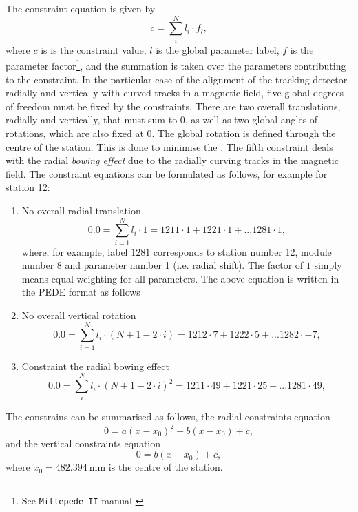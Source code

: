 \documentclass[12pt]{article}
\begin{document}
The constraint equation is given by
\begin{equation}
        c = \sum_i^N l_i\cdot f_l,
\end{equation}
where $c$ is is the constraint value, $l$ is the global parameter label, $f$ is the parameter factor\footnote{See \texttt{Millepede-II} manual \cite{mp2}}, and the summation is taken over the parameters contributing to the constraint. In the particular case of the alignment of the tracking detector radially and vertically with curved tracks in a magnetic field, five global degrees of freedom must be fixed by the constraints. There are two overall translations, radially and vertically, that must sum to 0, as well as two global angles of rotations, which are also fixed at 0. The global rotation is defined through the centre of the station. This is done to minimise the . The fifth constraint deals with the radial \textit{bowing effect} due to the radially curving tracks in the magnetic field. The constraint equations can be formulated as follows, for example for station 12:
\begin{enumerate}
    \item No overall radial translation
    \begin{equation}
        0.0 = \sum_{i=1}^N l_i\cdot 1 = 1211 \cdot 1 + 1221 \cdot 1 + ... 1281 \cdot 1,
    \end{equation}
    where, for example, label $1281$ corresponds to station number 12, module number 8 and parameter number 1 (i.e. radial shift). The factor of $1$ simply means equal weighting for all parameters. The above equation is written in the PEDE format as follows
    
    \item No overall vertical rotation
    \begin{equation}
        0.0 = \sum_{i=1}^N l_i\cdot (N+1-2\cdot i)  = 1212 \cdot 7 + 1222 \cdot 5 + ... 1282 \cdot -7,
    \end{equation}
    
    \item Constraint the radial bowing effect
     \begin{equation}
        0.0 = \sum_i^N l_i\cdot (N+1-2\cdot i)^2 = 1211 \cdot 49 + 1221 \cdot 25 + ... 1281 \cdot 49, \label{eq:bowing}
    \end{equation}
    
\end{enumerate}
The constrains can be summarised as follows, the radial constraints equation
\begin{equation}
    0=a(x-x_0)^2+b(x-x_0)+c,   
\end{equation}
and the vertical constraints equation  
\begin{equation}
    0=b(x-x_0)+c,
\end{equation}
where $x_0=\SI{482.394}{\milli\metre}$ is the centre of the station.
\end{document}
